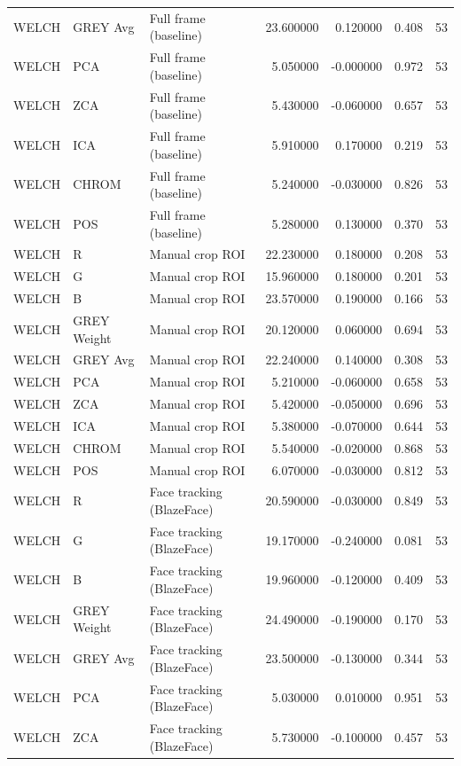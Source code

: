 \begin{table}[htbp]
\begin{tabular}{l l l r r l r}
WELCH & GREY Avg & Full frame (baseline) & 23.600000 & 0.120000 & 0.408 & 53 \\
WELCH & PCA & Full frame (baseline) & 5.050000 & -0.000000 & 0.972 & 53 \\
WELCH & ZCA & Full frame (baseline) & 5.430000 & -0.060000 & 0.657 & 53 \\
WELCH & ICA & Full frame (baseline) & 5.910000 & 0.170000 & 0.219 & 53 \\
WELCH & CHROM & Full frame (baseline) & 5.240000 & -0.030000 & 0.826 & 53 \\
WELCH & POS & Full frame (baseline) & 5.280000 & 0.130000 & 0.370 & 53 \\
WELCH & R & Manual crop ROI & 22.230000 & 0.180000 & 0.208 & 53 \\
WELCH & G & Manual crop ROI & 15.960000 & 0.180000 & 0.201 & 53 \\
WELCH & B & Manual crop ROI & 23.570000 & 0.190000 & 0.166 & 53 \\
WELCH & GREY Weight & Manual crop ROI & 20.120000 & 0.060000 & 0.694 & 53 \\
WELCH & GREY Avg & Manual crop ROI & 22.240000 & 0.140000 & 0.308 & 53 \\
WELCH & PCA & Manual crop ROI & 5.210000 & -0.060000 & 0.658 & 53 \\
WELCH & ZCA & Manual crop ROI & 5.420000 & -0.050000 & 0.696 & 53 \\
WELCH & ICA & Manual crop ROI & 5.380000 & -0.070000 & 0.644 & 53 \\
WELCH & CHROM & Manual crop ROI & 5.540000 & -0.020000 & 0.868 & 53 \\
WELCH & POS & Manual crop ROI & 6.070000 & -0.030000 & 0.812 & 53 \\
WELCH & R & Face tracking (BlazeFace) & 20.590000 & -0.030000 & 0.849 & 53 \\
WELCH & G & Face tracking (BlazeFace) & 19.170000 & -0.240000 & 0.081 & 53 \\
WELCH & B & Face tracking (BlazeFace) & 19.960000 & -0.120000 & 0.409 & 53 \\
WELCH & GREY Weight & Face tracking (BlazeFace) & 24.490000 & -0.190000 & 0.170 & 53 \\
WELCH & GREY Avg & Face tracking (BlazeFace) & 23.500000 & -0.130000 & 0.344 & 53 \\
WELCH & PCA & Face tracking (BlazeFace) & 5.030000 & 0.010000 & 0.951 & 53 \\
WELCH & ZCA & Face tracking (BlazeFace) & 5.730000 & -0.100000 & 0.457 & 53 \\

\end{tabular}
\end{table}
